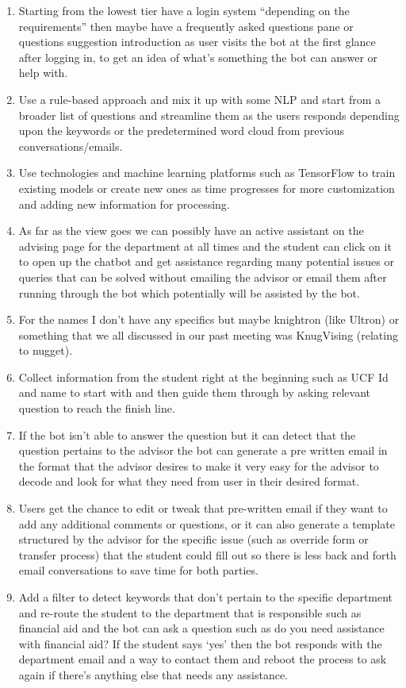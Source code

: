 \documentclass[titlepage, 12pt]{article}
\begin{document}
\begin{enumerate}
    \item Starting from the lowest tier have a login system “depending on the requirements” then maybe have a frequently asked questions pane or questions suggestion introduction as user visits the bot at the first glance after logging in, to get an idea of what’s something the bot can answer or help with.
    \item Use a rule-based approach and mix it up with some NLP and start from a broader list of questions and streamline them as the users responds depending upon the keywords or the predetermined word cloud from previous conversations/emails.
    \item Use technologies and machine learning platforms such as TensorFlow to train existing models or create new ones as time progresses for more customization and adding new information for processing.
    \item As far as the view goes we can possibly have an active assistant on the advising page for the department at all times and the student can click on it to open up the chatbot and get assistance regarding many potential issues or queries that can be solved without emailing the advisor or email them after running through the bot which potentially will be assisted by the bot.
    \item For the names I don’t have any specifics but maybe knightron (like Ultron) or something that we all discussed in our past meeting was KnugVising (relating to nugget). 
    \item Collect information from the student right at the beginning such as UCF Id and name to start with and then guide them through by asking relevant question to reach the finish line.
    \item If the bot isn’t able to answer the question but it can detect that the question pertains to the advisor the bot can generate a pre written email in the format that the advisor desires to make it very easy for the advisor to decode and look for what they need from user in their desired format.
    \item Users get the chance to edit or tweak that pre-written email if they want to add any additional comments or questions, or it can also generate a template structured by the advisor for the specific issue (such as override form or transfer process) that the student could fill out so there is less back and forth email conversations to save time for both parties.
    \item Add a filter to detect keywords that don’t pertain to the specific department and re-route the student to the department that is responsible such as financial aid and the bot can ask a question such as do you need assistance with financial aid? If the student says ‘yes’ then the bot responds with the department email and a way to contact them and reboot the process to ask again if there’s anything else that needs any assistance.

\end{enumerate}
\end{document}
